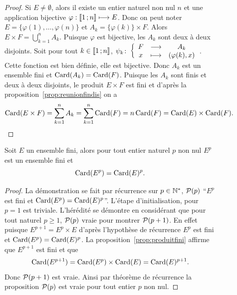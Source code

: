 \begin{figure}
\begin{proof}
Si \(E\neq\emptyset\), alors il existe un entier naturel non nul \(n\) et une application bijective \(\varphi:\intervalleentier{1}{n}\longmapsto E\). Donc on peut noter \(E=\{\varphi(1),\ldots ,\varphi(n)\}\) et \(A_k=\{\varphi(k)\}\times F\). Alors \(E\times F=\bigcup_{k=1}^n A_k\). Puisque \(\varphi\) est bijective, les \(A_k\) sont deux à deux disjoints. Soit pour tout \(k\in\intervalleentier{1}{n}\), \(\fonction{\psi_k}{F}{A_k}{x}{(\varphi(k),x)}\). Cette fonction est bien définie, elle est bijective. Donc \(A_k\) est un ensemble fini et \(\Card(A_k)=\Card(F)\). Puisque les \(A_k\) sont finis et deux à deux disjoints, le produit \(E\times F\) est fini et d'après la proposition~\ref{prop:reunionfindis} on a
    \begin{equation}
      \Card(E\times F)=\sum_{k=1}^{n} A_k=\sum_{k=1}^{n}\Card(F)=n\Card(F)=\Card(E)\times \Card(F).
    \end{equation}
\end{proof}
\begin{prop}
  Soit \(E\) un ensemble fini, alors pour tout entier naturel \(p\) non nul \(E^p\) est un ensemble fini et
  \begin{equation}
    \Card(E^p)=\Card(E)^p.
  \end{equation}
\end{prop}
\begin{proof}
  La démonstration se fait par récurrence sur \(p\in\N^*\), \(\P(p)\) ``\(E^p\) est fini et \(\Card(E^p)=\Card(E)^p\)''. L'étape d'initialisation, pour \(p=1\) est triviale. L'hérédité se démontre en considérant que pour tout naturel \(p\geqslant 1\), \(\P(p)\) vraie pour montrer \(\P(p+1)\). En effet puisque \(E^{p+1}=E^p \times E\) d'après l'hypothèse de récurrence \(E^p\) est fini et \(\Card(E^p)=\Card(E)^p\). La proposition~\ref{prop:produitfini} affirme que \(E^{p+1}\) est fini et que
  \begin{equation}
    \Card(E^{p+1})=\Card(E^p)\times \Card(E)=\Card(E)^{p+1}.
  \end{equation}
  Donc \(\P(p+1)\) est vraie. Ainsi par théorème de récurrence la proposition \(\P(p)\) est vraie pour tout entier \(p\) non nul.
\end{proof}


\end{figure}
